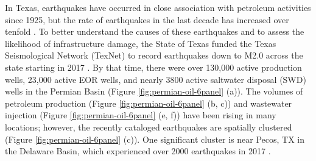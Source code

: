 






In Texas, earthquakes have occurred in close association with petroleum activities since 1925, but the rate of earthquakes in the last decade has increased over tenfold \citep{Frohlich2016HistoricalReviewInduced, Skoumal2020InducedSeismicityDelaware}.
To better understand the causes of these earthquakes and to assess the likelihood of infrastructure damage, 
the State of Texas funded the Texas Seismological Network (TexNet) to record earthquakes down to M2.0 across the state starting in 2017 \citep{Savvaidis2019TexnetStatewideSeismological}. 
By that time, there were over 130,000 active production wells, 23,000 active EOR wells, and nearly 3800 active saltwater disposal (SWD) wells in the Permian Basin (Figure \ref{fig:permian-oil-6panel} (a)).  
The volumes of petroleum production (Figure \ref{fig:permian-oil-6panel} (b, c)) and wastewater injection (Figure \ref{fig:permian-oil-6panel} (e, f)) have been rising in many locations; however, the recently cataloged earthquakes are spatially clustered (Figure \ref{fig:permian-oil-6panel} (c)). One significant cluster is near Pecos, TX in the Delaware Basin, which experienced over 2000 earthquakes in 2017 \citep{Frohlich2019OnsetCauseIncreased}. 



